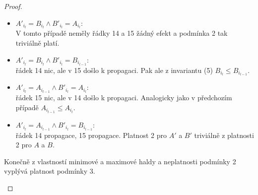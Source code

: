 \documentclass[12pt,a4paper]{article}
\theoremstyle{plain}
\begin{document}
\begin{proof}
\begin{itemize}
\begin{itemize}
\item $A'_{i_l} = B_{i_l} \wedge B'_{i_l} = A_{i_l} $: \\
V tomto případě neměly řádky 14 a 15 žádný efekt a podmínka 2 tak triviálně platí.

\item $A'_{i_l} = B_{i_l} \wedge B'_{i_l} = B_{i_{l - 1}} $: \\
řádek 14 nic, ale v 15 došlo k propagaci. Pak ale z invariantu (5) $ B_{i_l} \leq B_{i_{l - 1}} $.
\item $A'_{i_l} = A_{i_{l - 1}} \wedge B'_{i_l} = A_{i_l} $: \\
řádek 15 nic, ale v 14 došlo k propagaci. Analogicky jako v předchozím případě $ A_{i_{l - 1}} \leq A_{i_l} $.

\item $A'_{i_l} = A_{i_{l - 1}} \wedge B'_{i_l} = B_{i_{l - 1}} $: \\
řádek 14 propagace, 15 propagace. Platnost 2 pro $A'$ a $B'$ triviálně z platnosti 2 pro $A$ a $B$.

\end{itemize}

Konečně z vlastností minimové a maximové haldy a neplatnosti podmínky 2 vyplývá platnost podmínky 3.
\end{itemize}
\end{proof}
\end{document}
